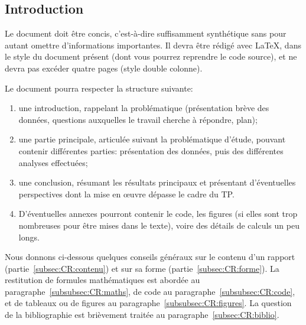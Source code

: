 \documentclass[twocolumn,10pt]{article}
\begin{document}

\subsection{Introduction}\label{subsec:CR:intro}

Le document doit être concis, c'est-à-dire suffisamment synthétique sans pour autant omettre d'informations importantes. Il devra être rédigé avec \LaTeX{}, dans le style du document présent (dont vous pourrez reprendre le code source), et ne devra pas excéder quatre pages (style double colonne). 

Le document pourra respecter la structure suivante: 
\begin{enumerate}
\item une introduction, rappelant la problématique (présentation brève des données, questions auxquelles le travail cherche à répondre, plan); 
\item une partie principale, articulée suivant la problématique d'étude, pouvant contenir différentes parties: présentation des données, puis des différentes analyses effectuées; 
\item une conclusion, résumant les résultats principaux et présentant d'éventuelles perspectives dont la mise en \oe{}uvre dépasse le cadre du TP. 
\item D'éventuelles annexes pourront contenir le code, les figures (si elles sont trop nombreuses pour être mises dans le texte), voire des détails de calculs un peu longs. 
\end{enumerate}

Nous donnons ci-dessous quelques conseils généraux sur le contenu d'un rapport (partie~\ref{subsec:CR:contenu}) et sur sa forme (partie~\ref{subsec:CR:forme}). La restitution de formules mathématiques est abordée au paragraphe~\ref{subsubsec:CR:maths}, de code au paragraphe~\ref{subsubsec:CR:code}, et de tableaux ou de figures au paragraphe~\ref{subsubsec:CR:figures}. 
La question de la bibliographie est brièvement traitée au paragraphe~\ref{subsec:CR:biblio}. 
\end{document}
